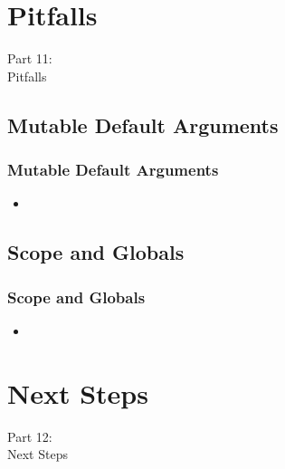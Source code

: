 
\section{Pitfalls}
\begin{frame}
    \vspace{25mm}
    \begin{center}
        \Huge{Part 11:\\Pitfalls}
    \end{center}
\end{frame}

\subsection{Mutable Default Arguments}
\begin{frame}
    \frametitle{Mutable Default Arguments}
    \vspace{5mm}
    
    \begin{itemize}
      \item 
    \end{itemize}
\end{frame}

\subsection{Scope and Globals}
\begin{frame}
    \frametitle{Scope and Globals}
    \vspace{5mm}
    
    \begin{itemize}
      \item 
    \end{itemize}
\end{frame}


\section{Next Steps}
\begin{frame}
    \vspace{25mm}
    \begin{center}
        \Huge{Part 12:\\Next Steps}
    \end{center}
\end{frame}

